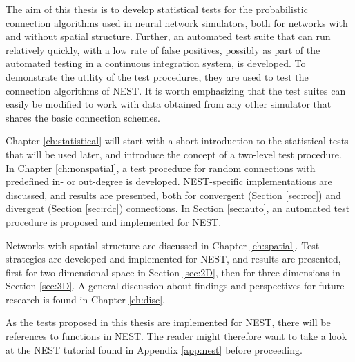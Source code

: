 The aim of this thesis is to develop statistical tests for the probabilistic connection algorithms used in neural network simulators, both for networks with and without spatial structure. Further, an automated test suite that can run relatively quickly, with a low rate of false positives, possibly as part of the automated testing in a continuous integration system, is developed. To demonstrate the utility of the test procedures, they are used to test the connection algorithms of NEST. It is worth emphasizing that the test suites can easily be modified to work with data obtained from any other simulator that shares the basic connection schemes. 

Chapter \ref{ch:statistical} will start with a short introduction to the statistical tests that will be used later, and introduce the concept of a two-level test procedure. In Chapter \ref{ch:nonspatial}, a test procedure for random connections with predefined in- or out-degree is developed. NEST-specific implementations are discussed, and results are presented, both for convergent (Section \ref{sec:rcc}) and divergent (Section \ref{sec:rdc}) connections. In Section \ref{sec:auto}, an automated test procedure is proposed and implemented for NEST.

Networks with spatial structure are discussed in Chapter \ref{ch:spatial}. Test strategies are developed and implemented for NEST, and results are presented, first for two-dimensional space in Section \ref{sec:2D}, then for three dimensions in Section \ref{sec:3D}. A general discussion about findings and perspectives for future research is found in Chapter \ref{ch:disc}.

As the tests proposed in this thesis are implemented for NEST, there will be references to functions in NEST. The reader might therefore want to take a look at the NEST tutorial found in Appendix \ref{app:nest} before proceeding. 



\clearchapter

